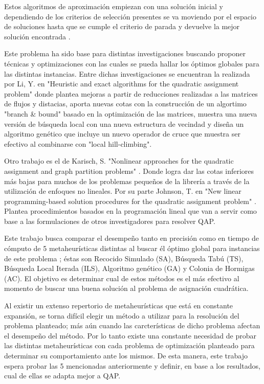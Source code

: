 \documentclass{ci5652}
\begin{document}
Estos algoritmos de aproximación empiezan con una solución inicial y dependiendo de los criterios de selección presentes se va moviendo por el espacio de soluciones hasta que se cumple el criterio de parada y devuelve la mejor solución encontrada \cite{4}.

Este problema ha sido base para distintas investigaciones buscando proponer técnicas y optimizaciones con las cuales se pueda hallar los óptimos globales para las distintas instancias. Entre dichas investigaciones se encuentran la realizada por Li, Y. en "Heuristic and exact algorithms for the quadratic assignment problem" \cite{12} donde plantea mejoras a partir de reducciones realizadas a las matrices de flujos y distacias, aporta nuevas cotas con la construcción de un algortimo "branch \& bound" basado en la optimización de las matrices, muestra una nueva versión de búsqueda local con una nueva estructura de vecindad y diseña un algoritmo genético que incluye un nuevo operador de cruce que muestra ser efectivo al combinarse con "local hill-climbing".

Otro trabajo es el de Karisch, S. "Nonlinear approaches for the quadratic assignment and graph partition problems" \cite{11}. Donde logra dar las cotas inferiores más bajas para muchos de los problemas pequeños de la librería a través de la utilización de enfoques no lineales. Por su parte Johnson, T. en "New linear programming-based solution procedures for the quadratic assignment problem" \cite{13}. Plantea procedimientos basados en la programación lineal que van a servir como base a las formulaciones de otros investigadores para resolver QAP.

Este trabajo busca comparar el desempeño tanto en precisión como en tiempo de cómputo de 5 metaheurísticas distintas al buscar él óptimo global para instancias de este problema ; éstas son Recocido Simulado (SA), Búsqueda Tabú (TS), Búsqueda Local Iterada (ILS), Algoritmo genético (GA) y Colonia de Hormigas (AC). El objetivo es determinar cual de estos métodos es el más efectivo al momento de buscar una buena solución al problema de asignación cuadrática.

Al existir un extenso repertorio de metaheurísticas que está en constante expansión, se torna difícil elegir un método a utilizar para la resolución del problema planteado; más aún cuando las carcterísticas de dicho problema afectan el desempeño del método. Por lo tanto existe una constante necesidad de probar las distintas metaheurísticas con cada problema de optimización planteado para determinar su comportamiento ante los mismos. De esta manera, este trabajo espera probar las 5 mencionadas anteriormente y definir, en base a los resultados, cual de ellas se adapta mejor a QAP.
\end{document}
